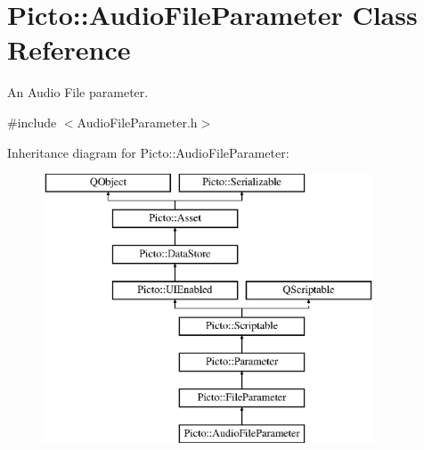 \hypertarget{class_picto_1_1_audio_file_parameter}{\section{Picto\-:\-:Audio\-File\-Parameter Class Reference}
\label{class_picto_1_1_audio_file_parameter}
}


An Audio File parameter.  




{\ttfamily \#include $<$Audio\-File\-Parameter.\-h$>$}

Inheritance diagram for Picto\-:\-:Audio\-File\-Parameter\-:\begin{figure}[H]
\begin{center}
\leavevmode
\includegraphics[height=8.000000cm]{class_picto_1_1_audio_file_parameter}
\end{center}
\end{figure}

